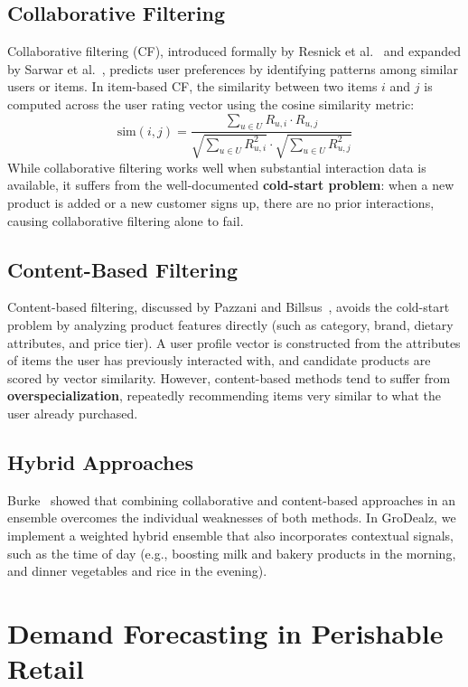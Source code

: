 \subsection{Collaborative Filtering}
Collaborative filtering (CF), introduced formally by Resnick et al.~\cite{resnick1994grouplens} and expanded by Sarwar et al.~\cite{sarwar2001item}, predicts user preferences by identifying patterns among similar users or items. In item-based CF, the similarity between two items $i$ and $j$ is computed across the user rating vector using the cosine similarity metric:
\begin{equation}
    \text{sim}(i, j) = \frac{\sum_{u \in U} R_{u,i} \cdot R_{u,j}}{\sqrt{\sum_{u \in U} R_{u,i}^2} \cdot \sqrt{\sum_{u \in U} R_{u,j}^2}}
\end{equation}
While collaborative filtering works well when substantial interaction data is available, it suffers from the well-documented \textbf{cold-start problem}: when a new product is added or a new customer signs up, there are no prior interactions, causing collaborative filtering alone to fail.

\subsection{Content-Based Filtering}
Content-based filtering, discussed by Pazzani and Billsus~\cite{pazzani2007content}, avoids the cold-start problem by analyzing product features directly (such as category, brand, dietary attributes, and price tier). A user profile vector is constructed from the attributes of items the user has previously interacted with, and candidate products are scored by vector similarity. However, content-based methods tend to suffer from \textbf{overspecialization}, repeatedly recommending items very similar to what the user already purchased.

\subsection{Hybrid Approaches}
Burke~\cite{burke2002hybrid} showed that combining collaborative and content-based approaches in an ensemble overcomes the individual weaknesses of both methods. In GroDealz, we implement a weighted hybrid ensemble that also incorporates contextual signals, such as the time of day (e.g., boosting milk and bakery products in the morning, and dinner vegetables and rice in the evening).

\section{Demand Forecasting in Perishable Retail}

